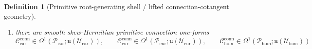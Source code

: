 \documentclass[11pt]{article}
\newcommand{\RootTensorClass}{\mathscr U_{\mathrm{car}}}
\newcommand{\RootRelabelClass}{\mathscr U_{\mathrm{cur}}}
\newcommand{\RootFreeClass}{\mathscr U_{\mathrm{hom}}}
\newcommand{\CurConfigSpace}{\mathcal Q_{\mathrm{cur}}}
\newcommand{\HomConfigSpace}{\mathcal Q_{\mathrm{hom}}}
\newcommand{\TensorRootLiouville}{\boldsymbol{\Lambda}_{\mathrm{car}}^{\mathrm{root}}}
\newcommand{\CurRootLiouville}{\boldsymbol{\Lambda}_{\mathrm{cur}}^{\mathrm{root}}}
\newcommand{\HomRootLiouville}{\boldsymbol{\Lambda}_{\mathrm{hom}}^{\mathrm{root}}}
\newcommand{\TensorRootTwo}{\boldsymbol{\Xi}_{\mathrm{car}}^{\mathrm{root}}}
\newcommand{\CurRootTwo}{\boldsymbol{\Xi}_{\mathrm{cur}}^{\mathrm{root}}}
\newcommand{\HomRootTwo}{\boldsymbol{\Xi}_{\mathrm{hom}}^{\mathrm{root}}}
\newcommand{\TensorPrimitiveSpace}{\mathcal P_{\mathrm{car}}}
\newcommand{\CurPrimitiveSpace}{\mathcal P_{\mathrm{cur}}}
\newcommand{\HomPrimitiveSpace}{\mathcal P_{\mathrm{hom}}}
\newcommand{\TensorPrimitiveTimeRev}{\sigma_{\mathrm{car}}^{\mathrm{prim}}}
\newcommand{\CurPrimitiveTimeRev}{\sigma_{\mathrm{cur}}^{\mathrm{prim}}}
\newcommand{\HomPrimitiveTimeRev}{\sigma_{\mathrm{hom}}^{\mathrm{prim}}}
\newcommand{\TensorRootInc}{\iota_{\mathrm{car}}^{\mathrm{root}}}
\newcommand{\CurRootInc}{\iota_{\mathrm{cur}}^{\mathrm{root}}}
\newcommand{\HomRootInc}{\iota_{\mathrm{hom}}^{\mathrm{root}}}
\newcommand{\TensorPrimitiveCotangentRealization}{\breve\Psi_{\mathrm{car}}}
\newcommand{\CurPrimitiveCotangentRealization}{\breve\Psi_{\mathrm{cur}}}
\newcommand{\HomPrimitiveCotangentRealization}{\breve\Psi_{\mathrm{hom}}}
\newcommand{\TensorPrimitiveLiouville}{\boldsymbol{\Lambda}_{\mathrm{car}}^{\mathrm{prim}}}
\newcommand{\CurPrimitiveLiouville}{\boldsymbol{\Lambda}_{\mathrm{cur}}^{\mathrm{prim}}}
\newcommand{\HomPrimitiveLiouville}{\boldsymbol{\Lambda}_{\mathrm{hom}}^{\mathrm{prim}}}
\newcommand{\TensorPrimitiveTwo}{\boldsymbol{\Xi}_{\mathrm{car}}^{\mathrm{prim}}}
\newcommand{\CurPrimitiveTwo}{\boldsymbol{\Xi}_{\mathrm{cur}}^{\mathrm{prim}}}
\newcommand{\HomPrimitiveTwo}{\boldsymbol{\Xi}_{\mathrm{hom}}^{\mathrm{prim}}}
\newcommand{\TensorPrimitiveConnectionForm}{\mathcal C_{\mathrm{car}}^{\mathrm{conn}}}
\newcommand{\CurPrimitiveConnectionForm}{\mathcal C_{\mathrm{cur}}^{\mathrm{conn}}}
\newcommand{\HomPrimitiveConnectionForm}{\mathcal C_{\mathrm{hom}}^{\mathrm{conn}}}
\newcommand{\LieU}{\mathfrak u}
\newtheorem{definition}{Definition}
\begin{document}
\begin{definition}[Primitive root-generating shell / lifted connection-cotangent geometry]
\begin{enumerate}
\[    \CurPrimitiveCotangentRealization:\CurPrimitiveSpace\to T^*\CurConfigSpace,\qquad
    \HomPrimitiveCotangentRealization:\HomPrimitiveSpace\to T^*\HomConfigSpace
    \]
    into the same recorded configuration spaces. Let \(\theta_{\mathrm{can}}\) denote the canonical Liouville one-form on the relevant cotangent bundle. Define primitive Liouville one-forms and closed two-forms by
    \begin{equation}
    \TensorPrimitiveLiouville\equiv(\TensorPrimitiveCotangentRealization)^*\theta_{\mathrm{can}},\qquad
    \CurPrimitiveLiouville\equiv(\CurPrimitiveCotangentRealization)^*\theta_{\mathrm{can}},\qquad
    \HomPrimitiveLiouville\equiv(\HomPrimitiveCotangentRealization)^*\theta_{\mathrm{can}},
    \label{eq:primitive_liouville}
    \end{equation}
    \begin{equation}
    \TensorPrimitiveTwo\equiv d\TensorPrimitiveLiouville,\qquad
    \CurPrimitiveTwo\equiv d\CurPrimitiveLiouville,\qquad
    \HomPrimitiveTwo\equiv d\HomPrimitiveLiouville.
    \label{eq:primitive_two}
    \end{equation}
    Assume
    \[
    (\TensorPrimitiveTimeRev)^*\TensorPrimitiveLiouville=-\TensorPrimitiveLiouville,\qquad
    (\CurPrimitiveTimeRev)^*\CurPrimitiveLiouville=-\CurPrimitiveLiouville,\qquad
    (\HomPrimitiveTimeRev)^*\HomPrimitiveLiouville=-\HomPrimitiveLiouville.
    \]
    Define the recorded root Liouville one-forms and closed two-forms by shell restriction:
    \begin{equation}
    \TensorRootLiouville\equiv(\TensorRootInc)^*\TensorPrimitiveLiouville,\qquad
    \CurRootLiouville\equiv(\CurRootInc)^*\CurPrimitiveLiouville,\qquad
    \HomRootLiouville\equiv(\HomRootInc)^*\HomPrimitiveLiouville,
    \label{eq:root_liouville_from_primitive}
    \end{equation}
    \begin{equation}
    \TensorRootTwo\equiv(\TensorRootInc)^*\TensorPrimitiveTwo,\qquad
    \CurRootTwo\equiv(\CurRootInc)^*\CurPrimitiveTwo,\qquad
    \HomRootTwo\equiv(\HomRootInc)^*\HomPrimitiveTwo.
    \label{eq:root_two_from_primitive}
    \end{equation}
    \item there are smooth skew-Hermitian primitive connection one-forms
    \[
    \TensorPrimitiveConnectionForm\in\Omega^1(\TensorPrimitiveSpace;\LieU(\RootTensorClass)),\qquad
    \CurPrimitiveConnectionForm\in\Omega^1(\CurPrimitiveSpace;\LieU(\RootRelabelClass)),\qquad
    \HomPrimitiveConnectionForm\in\Omega^1(\HomPrimitiveSpace;\LieU(\RootFreeClass))
\]
\end{enumerate}
\end{definition}
\end{document}
